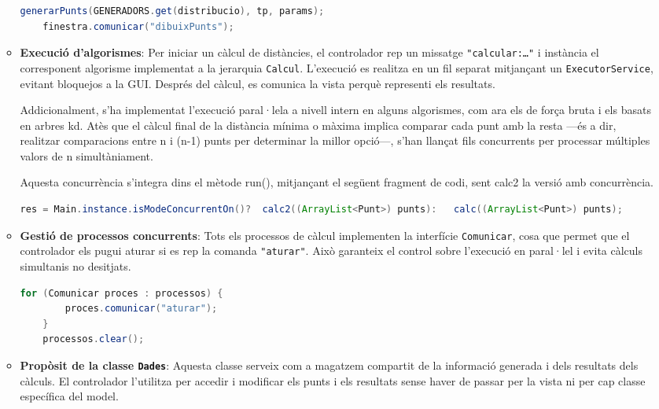 \documentclass{ieeetj}
\begin{document}
\begin{itemize}
\begin{itemize}
    \begin{lstlisting}[language=java]
    generarPunts(GENERADORS.get(distribucio), tp, params);
    finestra.comunicar("dibuixPunts");
    \end{lstlisting}

    \item \textbf{Execució d'algorismes}: Per iniciar un càlcul de distàncies, el controlador rep un missatge \texttt{"calcular:\dots"} i instància el corresponent algorisme implementat a la jerarquia \texttt{Calcul}. L’execució es realitza en un fil separat mitjançant un \texttt{ExecutorService}, evitant bloquejos a la GUI. Després del càlcul, es comunica la vista perquè representi els resultats.
    
    Addicionalment, s’ha implementat l’execució paral·lela a nivell intern en alguns algorismes, com ara els de força bruta i els basats en arbres kd. Atès que el càlcul final de la distància mínima o màxima implica comparar cada punt amb la resta —és a dir, realitzar comparacions entre n i (n-1) punts per determinar la millor opció—, s'han llançat fils concurrents per processar múltiples valors de n simultàniament.

Aquesta concurrència s’integra dins el mètode run(), mitjançant el següent fragment de codi, sent calc2 la versió amb concurrència.     
    \begin{lstlisting}[language=java]
    res = Main.instance.isModeConcurrentOn()?  calc2((ArrayList<Punt>) punts):   calc((ArrayList<Punt>) punts);
    \end{lstlisting}

     

    \item \textbf{Gestió de processos concurrents}: Tots els processos de càlcul implementen la interfície \texttt{Comunicar}, cosa que permet que el controlador els pugui aturar si es rep la comanda \texttt{"aturar"}. Això garanteix el control sobre l'execució en paral·lel i evita càlculs simultanis no desitjats.

    \begin{lstlisting}[language=java]
    for (Comunicar proces : processos) {
        proces.comunicar("aturar");
    }
    processos.clear();
    \end{lstlisting}

    \item \textbf{Propòsit de la classe \texttt{Dades}}: Aquesta classe serveix com a magatzem compartit de la informació generada i dels resultats dels càlculs. El controlador l’utilitza per accedir i modificar els punts i els resultats sense haver de passar per la vista ni per cap classe específica del model.


\end{itemize}
\end{itemize}
\end{document}
